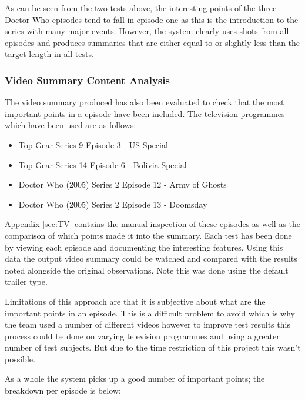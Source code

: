 As can be seen from the two tests above, the interesting points of the three Doctor Who
episodes tend to fall in episode one as this is the introduction to the series with many major events. However, the system clearly uses shots from all episodes and produces summaries that are either equal to or slightly less than the target length in all tests.

\subsubsection{Video Summary Content Analysis}
The video summary produced has also been evaluated to check that the most important points in a episode have been included. The television programmes which have been used are as follows:

\begin{itemize}
	\item{Top Gear Series 9 Episode 3 - US Special}
	\item{Top Gear Series 14 Episode 6 - Bolivia Special}
	\item{Doctor Who (2005) Series 2 Episode 12 - Army of Ghosts}
	\item{Doctor Who (2005) Series 2 Episode 13 - Doomsday}
\end{itemize}

Appendix \ref{sec:TV} contains the manual inspection of these episodes as well as the comparison of which points made it into the summary. Each test has been done by viewing each episode and documenting the interesting features. Using this data the output video summary could be watched and compared with the results noted alongside the original observations. Note this was done using the default trailer type.

Limitations of this approach are that it is subjective about what are the important points in an episode. This is a difficult problem to avoid which is why the team used a number of different videos however to improve test results this process could be done on varying television programmes and using a greater number of test subjects. But due to the time restriction of this project this wasn’t possible.

As a whole the system picks up a good number of important points; the breakdown per episode is below:

